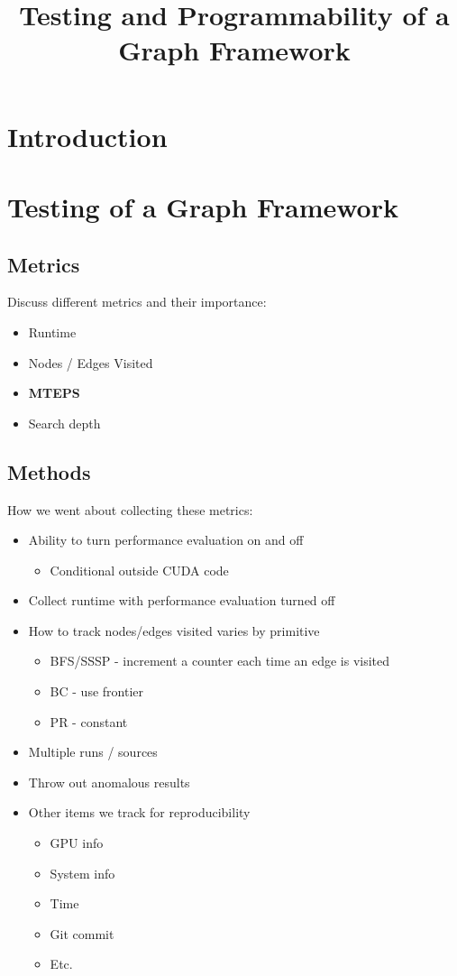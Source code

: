 \documentclass[11pt,a4paper]{article}
\title{Testing and Programmability of a Graph Framework}
\begin{document}
\maketitle

\section{Introduction}
\section{Testing of a Graph Framework}
\subsection{Metrics}
Discuss different metrics and their importance:
\begin{itemize}
    \item Runtime
    \item Nodes / Edges Visited
    \item \textbf{MTEPS}
    \item Search depth
\end{itemize}
\subsection{Methods}
How we went about collecting these metrics:
\begin{itemize}
\item Ability to turn performance evaluation on and off
    \begin{itemize}
    \item Conditional outside CUDA code
    \end{itemize}
\item Collect runtime with performance evaluation turned off
\item How to track nodes/edges visited varies by primitive
    \begin{itemize}
        \item BFS/SSSP - increment a counter each time an edge is visited
        \item BC - use frontier
        \item PR - constant
    \end{itemize}
\item Multiple runs / sources
\item Throw out anomalous results
\item Other items we track for reproducibility  
    \begin{itemize}
        \item GPU info
        \item System info
        \item Time
        \item Git commit
        \item Etc.
    \end{itemize}
\end{itemize}
\end{document}
